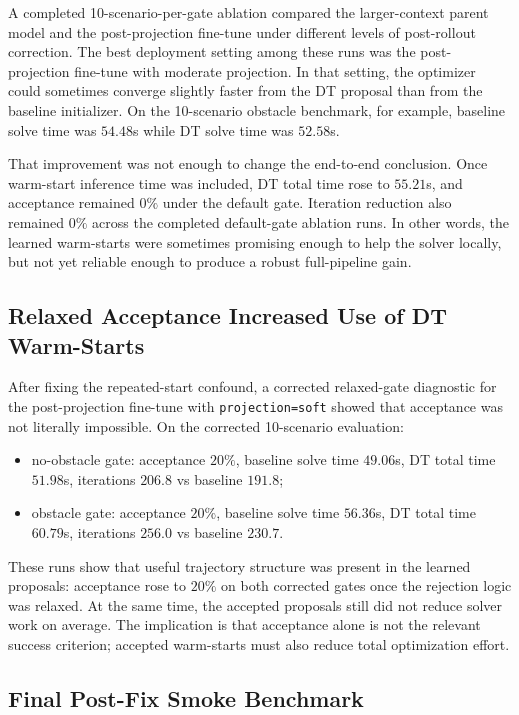 A completed 10-scenario-per-gate ablation compared the larger-context parent model and the post-projection fine-tune under different levels of post-rollout correction. The best deployment setting among these runs was the post-projection fine-tune with moderate projection. In that setting, the optimizer could sometimes converge slightly faster from the DT proposal than from the baseline initializer. On the 10-scenario obstacle benchmark, for example, baseline solve time was $54.48$s while DT solve time was $52.58$s.

That improvement was not enough to change the end-to-end conclusion. Once warm-start inference time was included, DT total time rose to $55.21$s, and acceptance remained $0\%$ under the default gate. Iteration reduction also remained $0\%$ across the completed default-gate ablation runs. In other words, the learned warm-starts were sometimes promising enough to help the solver locally, but not yet reliable enough to produce a robust full-pipeline gain.

\subsection{Relaxed Acceptance Increased Use of DT Warm-Starts}

After fixing the repeated-start confound, a corrected relaxed-gate diagnostic for the post-projection fine-tune with \texttt{projection=soft} showed that acceptance was not literally impossible. On the corrected 10-scenario evaluation:
\begin{itemize}
\item no-obstacle gate: acceptance $20\%$, baseline solve time $49.06$s, DT total time $51.98$s, iterations $206.8$ vs baseline $191.8$;
\item obstacle gate: acceptance $20\%$, baseline solve time $56.36$s, DT total time $60.79$s, iterations $256.0$ vs baseline $230.7$.
\end{itemize}

These runs show that useful trajectory structure was present in the learned proposals: acceptance rose to $20\%$ on both corrected gates once the rejection logic was relaxed. At the same time, the accepted proposals still did not reduce solver work on average. The implication is that acceptance alone is not the relevant success criterion; accepted warm-starts must also reduce total optimization effort.

\subsection{Final Post-Fix Smoke Benchmark}


